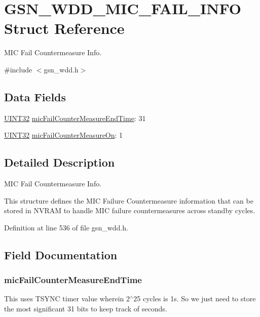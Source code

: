 \hypertarget{a00278}{
\section{GSN\_\-WDD\_\-MIC\_\-FAIL\_\-INFO Struct Reference}
\label{a00278}
}


MIC Fail Countermeasure Info.  




{\ttfamily \#include $<$gsn\_\-wdd.h$>$}

\subsection*{Data Fields}
\begin{DoxyCompactItemize}
\item 
\hyperlink{a00660_gae1e6edbbc26d6fbc71a90190d0266018}{UINT32} \hyperlink{a00278_acfe7ff83cae14c2fd857788864162be6}{micFailCounterMeasureEndTime}: 31
\item 
\hyperlink{a00660_gae1e6edbbc26d6fbc71a90190d0266018}{UINT32} \hyperlink{a00278_af8060b49986206c9a762eb3872a1ebe7}{micFailCounterMeasureOn}: 1
\end{DoxyCompactItemize}


\subsection{Detailed Description}
MIC Fail Countermeasure Info. 

This structure defines the MIC Failure Countermeasure information that can be stored in NVRAM to handle MIC failure countermeasures across standby cycles. 

Definition at line 536 of file gsn\_\-wdd.h.



\subsection{Field Documentation}
\hypertarget{a00278_acfe7ff83cae14c2fd857788864162be6}{
\subsubsection[{micFailCounterMeasureEndTime}]{ {\bf micFailCounterMeasureEndTime}}}
\label{a00278_acfe7ff83cae14c2fd857788864162be6}
This uses TSYNC timer value wherein 2$^\wedge$25 cycles is 1s. So we just need to store the most significant 31 bits to keep track of seconds. 


